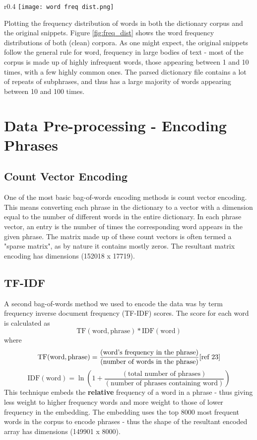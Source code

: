 \documentclass{article}
\begin{document}
\begin{wrapfigure}{r}{0.4\textwidth}
    \centering
    \texttt{[image: word freq dist.png]}
    \caption{Frequency distributions of words in dictionary corpus (right) and the original review corpus (left).}
    \label{fig:freq_dist}
\end{wrapfigure}
Plotting the frequency distribution of words in both the dictionary corpus and the original snippets.
Figure \ref{fig:freq_dist} shows the word frequency distributions of both (clean) corpora. As one might expect, the original snippets follow the general rule for word, frequency in large bodies of text - most of the corpus is made up of highly infrequent words, those appearing between 1 and 10 times, with a few highly common ones. The parsed dictionary file contains a lot of repeats of subphrases, and thus has a large majority of words appearing between 10 and 100 times.
\section{Data Pre-processing - Encoding Phrases}
\subsection*{Count Vector Encoding}
One of the most basic bag-of-words encoding methods is count vector encoding. This means converting each phrase in the dictionary to a vector with a dimension equal to the number of different words in the entire dictionary. In each phrase vector, an entry is the number of times the corresponding word appears in the given phrase. The matrix made up of these count vectors is often termed a "sparse matrix", as by nature it contains mostly zeros. The resultant matrix encoding has dimensions (152018 x 17719).
\subsection*{TF-IDF}
A second bag-of-words method we used to encode the data was by term frequency inverse document frequency (TF-IDF) scores. The score for each word is calculated as
$$
\text{TF}(\text{word}, \text{phrase}) * \text{IDF}(\text{word})
$$
where
$$
\text{TF}(\text{word}, \text{phrase}) = \frac{(\text{word's frequency in the phrase})}{(\text{number of words in the phrase})} \text{[ref 23]}\\
$$
$$
    \text{IDF}(\text{word}) = \ln \left(1 + \frac{(\text{total number of phrases})}{(\text{number of phrases containing word})}\right)
$$
This technique embeds the \textbf{relative} frequency of a word in a phrase - thus giving less weight to higher frequency words and more weight to those of lower frequency in the embedding. The embedding uses the top 8000 most frequent words in the corpus to encode phrases - thus the shape of the resultant encoded array has dimensions (149901 x 8000).
\end{document}
